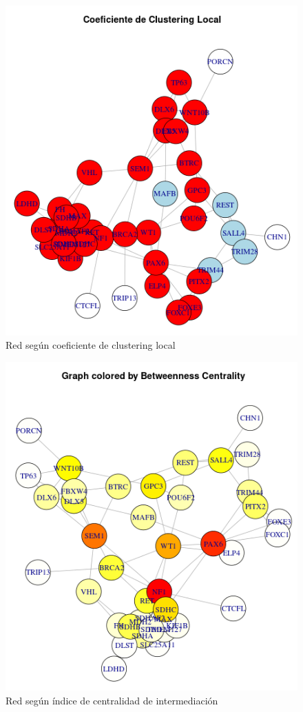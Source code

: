 \begin{figure}[!h] %
	\centering
	\includegraphics[scale=0.7]{figures/redCoefClustering.png} %
	\caption{Red según coeficiente de clustering local} %
	\label{fig:redCoefClustering}
\end{figure}

\begin{figure}[!h] %
	\centering
	\includegraphics[scale=0.7]{figures/redBetweenness.png} %
	\caption{Red según índice de centralidad de intermediación} %
	\label{fig:redBetweenness}
\end{figure}

